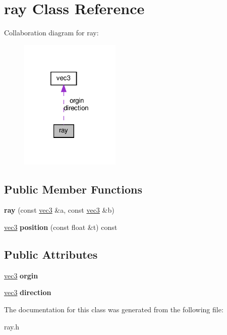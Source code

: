 \hypertarget{classray}{}\section{ray Class Reference}
\label{classray}


Collaboration diagram for ray\+:
\nopagebreak
\begin{figure}[H]
\begin{center}
\leavevmode
\includegraphics[width=136pt]{classray__coll__graph}
\end{center}
\end{figure}
\subsection*{Public Member Functions}
\begin{DoxyCompactItemize}
\item 
\mbox{\label{classray_ac94b9080a724c7bd62600165b41017a4}} 
{\bfseries ray} (const \hyperlink{classvec3}{vec3} \&a, const \hyperlink{classvec3}{vec3} \&b)
\item 
\mbox{\label{classray_aa978996b740c24be643e76a7f273d3e0}} 
\hyperlink{classvec3}{vec3} {\bfseries position} (const float \&t) const
\end{DoxyCompactItemize}
\subsection*{Public Attributes}
\begin{DoxyCompactItemize}
\item 
\mbox{\label{classray_a355df5fbaf73ad092e7bb95364d8fb81}} 
\hyperlink{classvec3}{vec3} {\bfseries orgin}
\item 
\mbox{\label{classray_a60c0e437ff2dbea2eb409b0ba68018c4}} 
\hyperlink{classvec3}{vec3} {\bfseries direction}
\end{DoxyCompactItemize}


The documentation for this class was generated from the following file\+:\begin{DoxyCompactItemize}
\item 
ray.\+h\end{DoxyCompactItemize}
